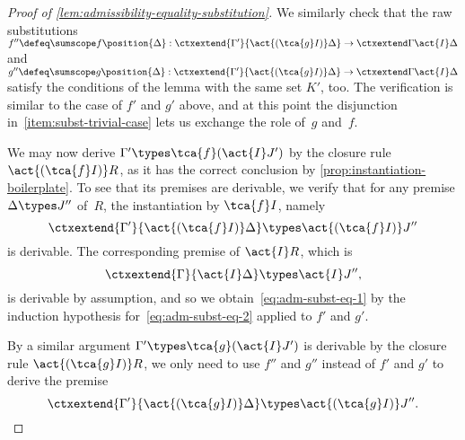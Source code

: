 \begin{proof}[Proof of \cref{lem:admissibility-equality-substitution}]
  We similarly check that the raw substitutions $f'' \defeq \sumscope f {\position{\Delta}} : \ctxextend {\Gamma'} {\act{(\tca{g} I)} \Delta} \to \ctxextend \Gamma {\act{I} \Delta}$ and $g'' \defeq \sumscope g {\position{\Delta}} : \ctxextend {\Gamma'} {\act{(\tca{g} I)} \Delta} \to \ctxextend \Gamma {\act{I} \Delta}$ satisfy the conditions of the lemma with the same set $K'$, too. The verification is similar to the case of $f'$ and $g'$ above, and at this point the disjunction in~\eqref{item:subst-trivial-case} lets us exchange the role of~$g$ and~$f$.

  We may now derive $\Gamma' \types \tca{f} (\act{I} J')$ by the closure rule $\act{(\tca{f}I)} R$, as it has the correct conclusion by \cref{prop:instantiation-boilerplate}. To see that its premises are derivable, we verify that for any premise $\Delta \types J''$ of~$R$, the instantiation by $\tca{f} I$, namely
  \begin{equation}
    \label{eq:adm-subst-eq-1}
    \ctxextend {\Gamma'}{\act{(\tca{f} I)} \Delta} \types \act{(\tca{f} I)} J''
  \end{equation}
  is derivable. The corresponding premise of $\act{I} R$, which is
  \begin{equation}
    \label{eq:adm-subst-eq-2}
    \ctxextend{\Gamma} {\act{I} \Delta} \types \act{I} J'',
  \end{equation}
  is derivable by assumption, and so we obtain~\eqref{eq:adm-subst-eq-1} by the induction hypothesis for~\eqref{eq:adm-subst-eq-2} applied to $f'$ and $g'$.

  By a similar argument $\Gamma' \types \tca{g} (\act{I} J')$ is derivable by the closure rule $\act{(\tca{g} I)} R$, we only need to use $f''$ and $g''$ instead of $f'$ and $g'$ to derive the premise
  \begin{equation}
    \label{eq:adm-subst-eq-3}
    \ctxextend {\Gamma'} {\act{(\tca{g} I)} \Delta} \types \act{(\tca{g} I)} J''.
  \end{equation}


\end{proof}
